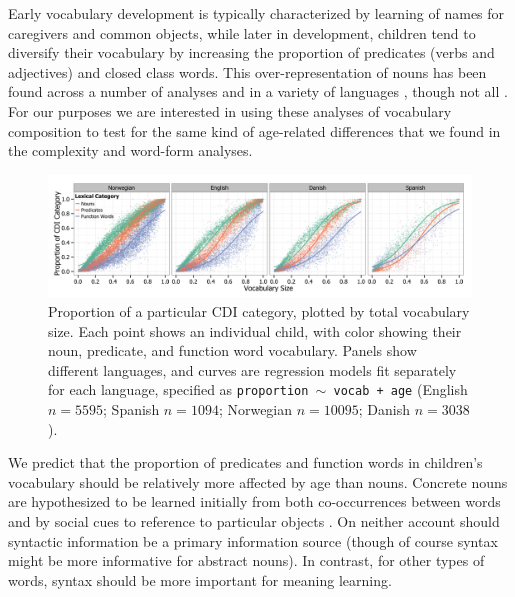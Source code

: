 \documentclass[10pt,letterpaper]{article}
\begin{document}
Early vocabulary development is typically characterized by learning of names for caregivers and common objects, while later in development, children tend to diversify their vocabulary by increasing the proportion of predicates (verbs and adjectives) and closed class words. This over-representation of nouns has been found across a number of analyses and in a variety of languages \cite{bates1994,caselli1995,bornstein2004}, though not all \cite{tardif1996,choi1995}.
For our purposes we are interested in using these analyses of vocabulary composition to test for the same kind of age-related differences that we found in the complexity and word-form analyses. 

\begin{figure}
\begin{center}
\includegraphics[width=\linewidth]{plots/composition_fit.png}
\end{center}
\caption{\label{fig:vocab_comp} Proportion of a particular CDI category, plotted by total vocabulary size. Each point shows an individual child, with color showing their noun, predicate, and function word vocabulary. Panels show different languages, and curves are regression models fit separately for each language, specified as \small{\tt{proportion $\sim$ vocab + age}} (English $n=5595$; Spanish $n=1094$; Norwegian $n=10095$; Danish $n=3038$).}
\end{figure}

We predict that the proportion of predicates and function words in children's vocabulary should be relatively more affected by age than nouns. Concrete nouns are hypothesized to be learned initially from both co-occurrences between words \cite{yu2007b} and by social cues to reference to particular objects \cite{bloom2002}. On neither account should syntactic information be a primary information source (though of course syntax might be more informative for abstract nouns). In contrast, for other types of words, syntax should be more important for meaning learning. 
\end{document}
